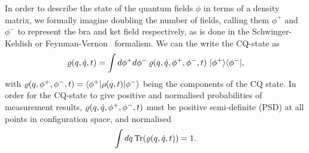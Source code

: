 \documentclass[aps,preprintnumbers,superscriptaddress,longbibliography]{revtex4-1}
\def\z{{q,\dot{q}}}
\begin{document}
In order to describe the state of the quantum fields $\phi$ in terms of a density matrix, we formally imagine doubling the number of fields, calling them $\phi^+$ and $\phi^-$ to represent the bra and ket field respectively, as is done in the Schwinger-Keldish or Feynman-Vernon~\cite{FeynmanVernon1963} formalism. We can the write the CQ-state as
\begin{equation}\label{eq: statecomponents}
    \cqstate( \z,t) = \int d \phi^+ d\phi^-\, \cqstate(\z,\phi^+,\phi^-,t) \ | \phi^+ \rangle \langle \phi^- |,
\end{equation}
with $\varrho( q,\phi^+,\phi^-,t) = \langle \phi^+| \rho(q,t)|\phi^- \rangle $ being the components of the CQ state. In order for the CQ-state to give positive and normalised probabilities of measurement results, $\cqstate(\z,\phi^+,\phi^-,t)$ must be positive semi-definite (PSD) at all points in configuration space, and normalised
\begin{align}
    \int dq\,\text{Tr}(\cqstate( \z,t))=1.
\end{align}
\end{document}
